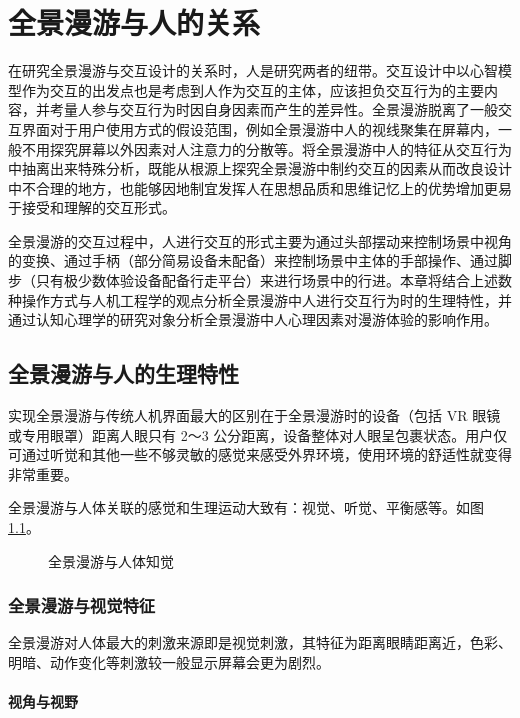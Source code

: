 \chapter{全景漫游与人的关系}

在研究全景漫游与交互设计的关系时，人是研究两者的纽带。交互设计中以心智模型作为交互的出发点也是考虑到人作为交互的主体，应该担负交互行为的主要内容，并考量人参与交互行为时因自身因素而产生的差异性。全景漫游脱离了一般交互界面对于用户使用方式的假设范围，例如全景漫游中人的视线聚集在屏幕内，一般不用探究屏幕以外因素对人注意力的分散等。将全景漫游中人的特征从交互行为中抽离出来特殊分析，既能从根源上探究全景漫游中制约交互的因素从而改良设计中不合理的地方，也能够因地制宜发挥人在思想品质和思维记忆上的优势增加更易于接受和理解的交互形式。

全景漫游的交互过程中，人进行交互的形式主要为通过头部摆动来控制场景中视角的变换、通过手柄（部分简易设备未配备）来控制场景中主体的手部操作、通过脚步（只有极少数体验设备配备行走平台）来进行场景中的行进。本章将结合上述数种操作方式与人机工程学的观点分析全景漫游中人进行交互行为时的生理特性，并通过认知心理学的研究对象分析全景漫游中人心理因素对漫游体验的影响作用。

\section{全景漫游与人的生理特性}
实现全景漫游与传统人机界面最大的区别在于全景漫游时的设备（包括 VR 眼镜或专用眼罩）距离人眼只有 2～3 公分距离，设备整体对人眼呈包裹状态。用户仅可通过听觉和其他一些不够灵敏的感觉来感受外界环境，使用环境的舒适性就变得非常重要。

全景漫游与人体关联的感觉和生理运动大致有：视觉、听觉、平衡感等。如图\ref{fig:human_sence}。

\begin{figure}[htp]
\centering
{}
\caption{全景漫游与人体知觉}
\label{fig:human_sence}
\end{figure}

\subsection{全景漫游与视觉特征}
全景漫游对人体最大的刺激来源即是视觉刺激，其特征为距离眼睛距离近，色彩、明暗、动作变化等刺激较一般显示屏幕会更为剧烈。

\subsubsection{视角与视野}

